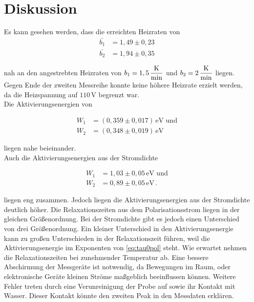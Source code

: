 \section{Diskussion}
\label{sec:Diskussion}

Es kann gesehen werden, dass die erreichten Heizraten von 
\begin{align*}
    \bar{b_1} &=   1,49 \pm  0,23 \\
    \bar{b_2} &=   1,94 \pm  0,35  
\end{align*}

nah an den angestrebten Heizraten von $ b_1 = 1,5 \, \unit{\dfrac{\kelvin}{\minute}}$ 
und $ b_2 = 2 \, \unit{\dfrac{\kelvin}{\minute}}$ liegen.
Gegen Ende der zweiten Messreihe konnte keine höhere Heizrate erzielt werden, da die Heizspannung auf $110 \,\si{\volt}$ begrenzt war. \\
Die Aktivierungsenergien von 

\begin{align*}
W_1 &=   (0,359 \pm 0,017) \, \unit{\electronvolt} \, \, \text{und}  \\
W_2 &=   (0,348 \pm 0,019) \, \unit{\electronvolt}
\end{align*} 

liegen nahe beieinander. \\
Auch die Aktivierungsenergien aus der Stromdichte

\begin{align*}
    W_1 &= 1,03 \pm 0,05 \, \unit{\electronvolt}  \, \,  \text{und} \\
    W_2 &= 0,89 \pm 0,05 \, \unit{\electronvolt}    \,.
\end{align*}

liegen eng zusammen. Jedoch liegen die Aktivierungsenergien aus der Stromdichte deutlich höher.
Die Relaxationszeiten aus dem Polarisationsstrom liegen in der gleichen Größenordnung.
Bei der Stromdichte gibt es jedoch einen Unterschied von drei Größenordnung.
Ein kleiner Unterschied in den Aktivierungsenergie kann zu großen Unterschieden in der Relaxationszeit führen, weil 
die Aktivierungsenergie im Exponenten von \autoref{eq:tau0pol} steht.
Wie erwartet nehmen die Relaxationszeiten bei zunehmender Temperatur ab.
Eine bessere Abschirmung der Messgeräte ist notwendig, da Bewegungen im Raum, 
oder elektronische Geräte kleinen Ströme maßgeblich beeinflussen können.
Weitere Fehler treten durch eine Verunreinigung der Probe auf sowie ihr Kontakt mit Wasser.
Dieser Kontakt könnte den zweiten Peak in den Messdaten erklären.
